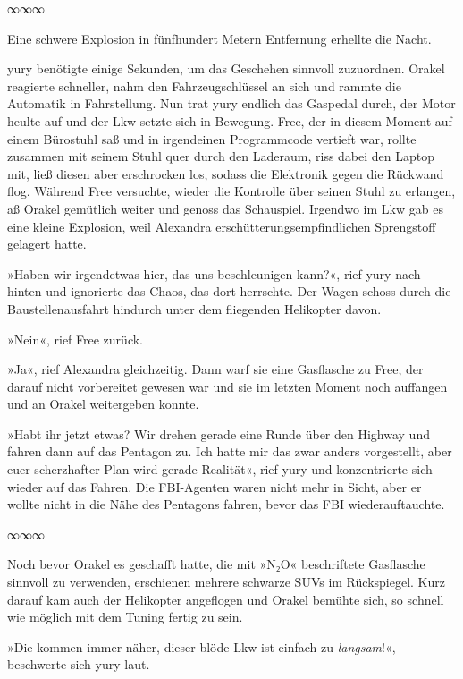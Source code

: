 \begin{center}
∞∞∞
\end{center}

Eine schwere Explosion in fünfhundert Metern Entfernung erhellte die Nacht.

yury benötigte einige Sekunden, um das Geschehen sinnvoll zuzuordnen. Orakel reagierte schneller, nahm den Fahrzeugschlüssel an sich und rammte die Automatik in Fahrstellung. Nun trat yury endlich das Gaspedal durch, der Motor heulte auf und der Lkw setzte sich in Bewegung. Free, der in diesem Moment auf einem Bürostuhl saß und in irgendeinen Programmcode vertieft war, rollte zusammen mit seinem Stuhl quer durch den Laderaum, riss dabei den Laptop mit, ließ diesen aber erschrocken los, sodass die Elektronik gegen die Rückwand flog. Während Free versuchte, wieder die Kontrolle über seinen Stuhl zu erlangen, aß Orakel gemütlich weiter und genoss das Schauspiel. Irgendwo im Lkw gab es eine kleine Explosion, weil Alexandra erschütterungsempfindlichen Sprengstoff gelagert hatte.

»Haben wir irgendetwas hier, das uns beschleunigen kann?«, rief yury nach hinten und ignorierte das Chaos, das dort herrschte. Der Wagen schoss durch die Baustellenausfahrt hindurch unter dem fliegenden Helikopter davon.

»Nein«, rief Free zurück.

»Ja«, rief Alexandra gleichzeitig. Dann warf sie eine Gasflasche zu Free, der darauf nicht vorbereitet gewesen war und sie im letzten Moment noch auffangen und an Orakel weitergeben konnte.

»Habt ihr jetzt etwas? Wir drehen gerade eine Runde über den Highway und fahren dann auf das Pentagon zu. Ich hatte mir das zwar anders vorgestellt, aber euer scherzhafter Plan wird gerade Realität«, rief yury und konzentrierte sich wieder auf das Fahren. Die FBI-Agenten waren nicht mehr in Sicht, aber er wollte nicht in die Nähe des Pentagons fahren, bevor das FBI wiederauftauchte.

\begin{center}
∞∞∞
\end{center}

Noch bevor Orakel es geschafft hatte, die mit »N₂O« beschriftete Gasflasche sinnvoll zu verwenden, erschienen mehrere schwarze SUVs im Rückspiegel. Kurz darauf kam auch der Helikopter angeflogen und Orakel bemühte sich, so schnell wie möglich mit dem Tuning fertig zu sein.

»Die kommen immer näher, dieser blöde Lkw ist einfach zu \emph{langsam}!«, beschwerte sich yury laut.


